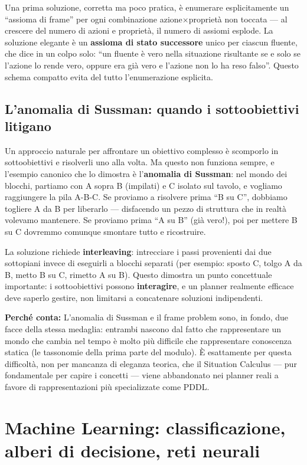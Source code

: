 \documentclass[11pt,a4paper]{article}
\newcommand{\perche}[1]{\begin{nota}\textbf{Perché conta:} #1\end{nota}}
\begin{document}
Una prima soluzione, corretta ma poco pratica, è enumerare esplicitamente un ``assioma di frame'' per ogni combinazione azione$\times$proprietà non toccata --- al crescere del numero di azioni e proprietà, il numero di assiomi esplode. La soluzione elegante è un \textbf{assioma di stato successore} unico per ciascun fluente, che dice in un colpo solo: ``un fluente è vero nella situazione risultante se e solo se l'azione lo rende vero, oppure era già vero e l'azione non lo ha reso falso''. Questo schema compatto evita del tutto l'enumerazione esplicita.

\subsection{L'anomalia di Sussman: quando i sottoobiettivi litigano}

Un approccio naturale per affrontare un obiettivo complesso è scomporlo in sottoobiettivi e risolverli uno alla volta. Ma questo non funziona sempre, e l'esempio canonico che lo dimostra è l'\textbf{anomalia di Sussman}: nel mondo dei blocchi, partiamo con A sopra B (impilati) e C isolato sul tavolo, e vogliamo raggiungere la pila A-B-C. Se proviamo a risolvere prima ``B su C'', dobbiamo togliere A da B per liberarlo --- disfacendo un pezzo di struttura che in realtà volevamo mantenere. Se proviamo prima ``A su B'' (già vero!), poi per mettere B su C dovremmo comunque smontare tutto e ricostruire.

La soluzione richiede \textbf{interleaving}: intrecciare i passi provenienti dai due sottopiani invece di eseguirli a blocchi separati (per esempio: sposto C, tolgo A da B, metto B su C, rimetto A su B). Questo dimostra un punto concettuale importante: i sottoobiettivi possono \textbf{interagire}, e un planner realmente efficace deve saperlo gestire, non limitarsi a concatenare soluzioni indipendenti.

\perche{L'anomalia di Sussman e il frame problem sono, in fondo, due facce della stessa medaglia: entrambi nascono dal fatto che rappresentare un mondo che cambia nel tempo è molto più difficile che rappresentare conoscenza statica (le tassonomie della prima parte del modulo). È esattamente per questa difficoltà, non per mancanza di eleganza teorica, che il Situation Calculus --- pur fondamentale per capire i concetti --- viene abbandonato nei planner reali a favore di rappresentazioni più specializzate come PDDL.}

\newpage
\section{Machine Learning: classificazione, alberi di decisione, reti neurali}
\end{document}
